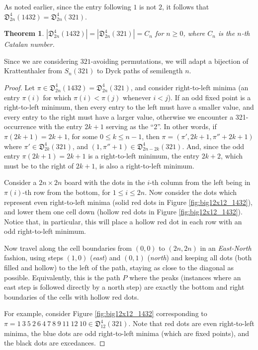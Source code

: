 \documentclass[
final
]{dmtcs-episciences}
\newtheorem{theorem}{Theorem}[section]%
\theoremstyle{definition}
\theoremstyle{remark}
\begin{document}
As noted earlier, since the entry following $1$ is not $2$, it follows that $\mathfrak{D}^4_{2n}(1432)=\mathfrak{D}^4_{2n}(321)$.

\begin{theorem}
\label{thm:1432}
$|\mathfrak{D}^4_{2n}(1432)|=|\mathfrak{D}^4_{2n}(321)|=C_n$ for $n \ge 0$, where $C_n$ is the $n$-th Catalan number.
\label{321thm}
\end{theorem}

Since we are considering $321$-avoiding permutations, we will adapt a bijection of Krattenthaler \cite{Krattenthaler} from $S_n(321)$ to Dyck paths of semilength $n$.

\begin{proof}
Let $\pi \in \mathfrak{D}^4_{2n}(1432) = \mathfrak{D}^4_{2n}(321)$, and consider right-to-left minima (an entry $\pi(i)$ for which $\pi(i) < \pi(j)$ whenever $i < j$).  If an odd fixed point is a right-to-left minimum, then every entry to the left must have a smaller value, and every entry to the right must have a larger value, otherwise we encounter a 321-occurrence with the entry $2k+1$ serving as the ``2''.  In other words, if $\pi(2k+1) = 2k+1$, for some $0 \le k \le n-1$, then $\pi = (\pi', 2k+1, \pi''+2k+1)$ where $\pi' \in \mathfrak{D}^4_{2k}(321)$, and $(1,\pi''+1) \in \mathfrak{D}^4_{2n-2k}(321)$.  And, since the odd entry $\pi(2k+1) = 2k+1$ is a right-to-left minimum, the entry $2k+2$, which must be to the right of $2k+1$, is also a right-to-left minimum.

Consider a $2n \times 2n$ board with the dots in the $i$-th column from the left being in $\pi(i)$-th row from the bottom, for $1\le i\le 2n$. Now consider the dots which represent even right-to-left minima (solid red dots in Figure \ref{fig:big12x12_1432}), and lower them one cell down (hollow red dots in Figure \ref{fig:big12x12_1432}). Notice that, in particular, this will place a hollow red dot in each row with an odd right-to-left minimum.

Now travel along the cell boundaries from $(0, 0)$ to $(2n, 2n)$ in an \emph{East-North} fashion, using steps $(1,0)$ (\emph{east}) and $(0,1)$ (\emph{north}) and keeping all dots (both filled and hollow) to the left of the path, staying as close to the diagonal as possible. Equivalently, this is the path $P$ where the peaks (instances where an east step is followed directly by a north step) are exactly the bottom and right boundaries of the cells with hollow red dots.

For example, consider Figure \ref{fig:big12x12_1432} corresponding to $\pi = 1\ 3\ 5\ 2\ 6\ 4\ 7\ 8\ 9\ 11\ 12\ 10 \in \mathfrak{D}^4_{12}(321)$. Note that red dots are even right-to-left minima, the blue dots are odd right-to-left minima (which are fixed points), and the black dots are excedances.  


\end{proof}
\end{document}
